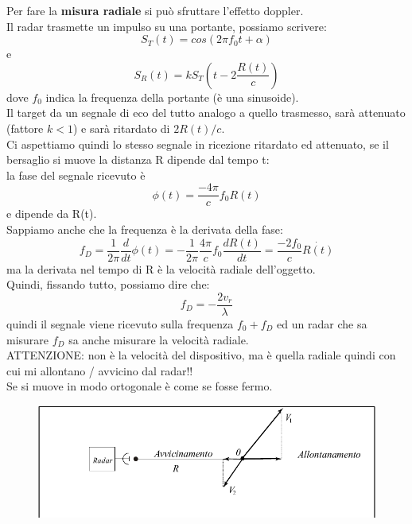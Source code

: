 \documentclass[oneside, 12pt]{extbook}
\begin{document}
Per fare la \textbf{misura radiale} si può sfruttare l'effetto doppler.\\
Il radar trasmette un impulso su una portante, possiamo scrivere:
\begin{equation}
	S_T(t) = cos(2\pi f_0 t+ \alpha)
\end{equation}
e
\begin{equation}
	S_R(t) = kS_T(t - 2\frac{R(t)}{c})
\end{equation}
dove $f_0$ indica la frequenza della portante (è una sinusoide).\\
Il target da un segnale di eco del tutto analogo a quello trasmesso, sarà attenuato (fattore $k < 1$) e sarà ritardato di $2R(t)/c$.\\
Ci aspettiamo quindi lo stesso segnale in ricezione ritardato ed attenuato, se il bersaglio si muove la distanza R dipende dal tempo t:\\ la fase del segnale ricevuto è 
\begin{equation}
	\phi(t) = \frac{-4\pi}{c}f_0R(t)
\end{equation}
e dipende da R(t).\\
Sappiamo anche che la frequenza è la derivata della fase:
\begin{equation}
	f_D = \frac{1}{2\pi} \frac{d}{dt}\phi(t) = -\frac{1}{2\pi}\frac{4\pi}{c}f_0 \frac{dR(t)}{dt} = \frac{-2f_0}{c}\dot{R(t)}
\end{equation}
ma la derivata nel tempo di R è la velocità radiale dell'oggetto.
\\Quindi, fissando tutto, possiamo dire che:
\begin{equation}
	f_D = -\frac{2v_r}{\lambda}
\end{equation}
quindi il segnale viene ricevuto sulla frequenza $f_0 + f_D$ ed un radar che sa misurare $f_D$ sa anche misurare la velocità radiale.\\
ATTENZIONE: non è la velocità del dispositivo, ma è quella radiale quindi con cui mi allontano / avvicino dal radar!!\\
Se si muove in modo ortogonale è come se fosse fermo.\\
\begin{figure}[!h]
	\includegraphics[scale=0.5]{immagini/localization/allont-avvic.png}
\end{figure}\\\\
\end{document}
